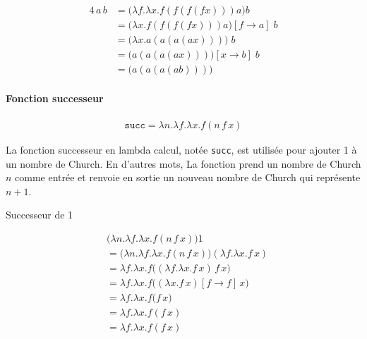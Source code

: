 \documentclass{report}
\begin{document}
\begin{multicols*}{3}
  \begin{EExample}{}{}
    \begin{align*}
      4 \, a \, b &= \bigl(\lambda f . \lambda x . f( f( f( f x))) a \bigr) b
      \\ 
              &= \bigl(\lambda x . f( f( f( f x))) a \bigr)[f \rightarrow a] \; b 
      \\
              &= \bigl(\lambda x . a ( a ( a ( a x)))\bigr) \; b 
      \\
              &= \bigl( a ( a ( a ( a x)))\bigr)[x \rightarrow b] \; b 
      \\ 
              &= \bigl( a ( a ( a ( a b)))\bigr) 
    \end{align*}
  \end{EExample}

  \paragraph{Fonction successeur}
  
  \begin{align*}
     \texttt{succ} = \lambda n . \lambda f . \lambda x . f(n \, f \, x)
  \end{align*}

  La fonction successeur en lambda calcul, notée 
  \texttt{succ}, est utilisée pour ajouter 1 à un nombre de Church.
  En d'autres mots, La fonction prend un nombre de Church $n$
  comme entrée et renvoie en sortie un nouveau nombre de Church qui représente 
  $n + 1$. 


  \begin{EExample}{Successeur de 1}{}

  \begin{align*}
    &\bigl(\lambda n . \lambda f . \lambda x . f (n \, f \, x) \bigr) 1 
    \\
    &= 
    \bigl(\lambda n . \lambda f . \lambda x . f (n \, f \, x) \bigr) 
    (\lambda f . \lambda x . f \, x)
    \\ 
    &= 
    \lambda f . \lambda x . f \bigl((\lambda f . \lambda x . f \, x) \, f \, x\bigr) 
    \\
    &= 
    \lambda f . \lambda x . f \bigl((\lambda x . f \, x)[f \rightarrow f] \, x\bigr)
    \\ 
    &= 
    \lambda f . \lambda x . f \bigl(f \, x\bigr)
    \\
    &= 
    \lambda f . \lambda x . f (f \, x)
    \\
    &= 
    \lambda f . \lambda x . f (f \, x)
  \end{align*} 
  \end{EExample}



\end{multicols*}
\end{document}
